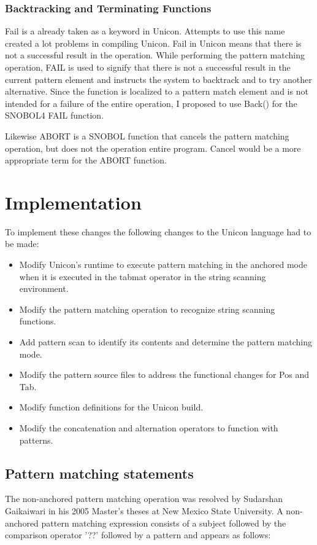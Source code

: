 \documentclass{article}
\begin{document}
\vspace{2 pc}
\subsubsection{Backtracking and Terminating Functions}
Fail is a already taken as a keyword in Unicon.  Attempts to use this name created a lot problems in compiling Unicon.  Fail in Unicon means that there is not a successful result in the operation.  While performing the pattern matching operation, FAIL is used to signify that there is not a successful result in the current pattern element and instructs the system to backtrack and to try another alternative.  Since the function is localized to a pattern match element and is not intended for a failure of the entire operation, I proposed to use Back() for the SNOBOL4 FAIL function.

Likewise ABORT is a SNOBOL function that cancels the pattern matching operation, but does not the operation entire program.  Cancel would be a more appropriate term for the ABORT function. 

\section{Implementation}
To implement these changes the following changes to the Unicon language had to be made:
\begin{itemize}
\item Modify Unicon's runtime to execute pattern matching in the anchored mode when it is executed in the tabmat operator in the string scanning environment.
\item Modify the pattern matching operation to recognize string scanning functions.
\item Add pattern scan to identify its contents and determine the pattern matching mode.
\item Modify the pattern source files to address the functional changes for Pos and Tab.
\item Modify function definitions for the Unicon build.
\item Modify the concatenation and alternation operators to function with patterns.
\end{itemize}

\subsection{Pattern matching statements}
The non-anchored pattern matching operation was resolved by Sudarshan Gaikaiwari in his 2005 Master's theses at New Mexico State University.  A non-anchored pattern matching expression consists of a subject followed by the comparison operator '??' followed by a pattern and appears as follows:
\end{document}

